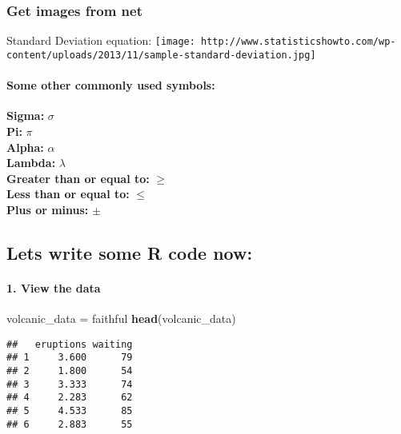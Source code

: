\documentclass[]{article}
\newenvironment{Shaded}{\begin{snugshade}}{\end{snugshade}}
\newcommand{\KeywordTok}[1]{\textcolor[rgb]{0.13,0.29,0.53}{\textbf{#1}}}
\newcommand{\NormalTok}[1]{#1}
\newcommand{\StringTok}[1]{\textcolor[rgb]{0.31,0.60,0.02}{#1}}
\let\oldparagraph\paragraph
\renewcommand{\paragraph}[1]{\oldparagraph{#1}\mbox{}}
\begin{document}
\hypertarget{get-images-from-net}{%
\subsubsection{Get images from net}\label{get-images-from-net}}

Standard Deviation equation:
\texttt{[image: http://www.statisticshowto.com/wp-content/uploads/2013/11/sample-standard-deviation.jpg]}

\hypertarget{some-other-commonly-used-symbols}{%
\paragraph{Some other commonly used
symbols:}\label{some-other-commonly-used-symbols}}

\textbf{Sigma:} \(\sigma\)\\
\textbf{Pi:} \(\pi\)\\
\textbf{Alpha:} \(\alpha\)\\
\textbf{Lambda:} \(\lambda\)\\
\textbf{Greater than or equal to:} \(\ge\)\\
\textbf{Less than or equal to:} \(\le\)\\
\textbf{Plus or minus:} \(\pm\)

\hypertarget{lets-write-some-r-code-now}{%
\subsection{Lets write some R code
now:}\label{lets-write-some-r-code-now}}

\hypertarget{view-the-data}{%
\paragraph{1. View the data}\label{view-the-data}}

\begin{Shaded}
\begin{Highlighting}[]
\NormalTok{volcanic_data =}\StringTok{ }\NormalTok{faithful}
\KeywordTok{head}\NormalTok{(volcanic_data)}
\end{Highlighting}
\end{Shaded}

\begin{verbatim}
##   eruptions waiting
## 1     3.600      79
## 2     1.800      54
## 3     3.333      74
## 4     2.283      62
## 5     4.533      85
## 6     2.883      55
\end{verbatim}
\end{document}
